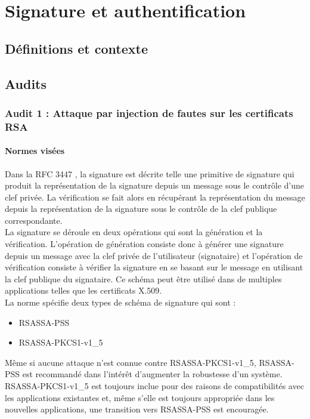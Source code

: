 \chapter{Signature et authentification}
\section{Définitions et contexte}

\section{Audits}
	\subsection{Audit 1 : Attaque par injection de fautes sur les certificats RSA}
		\subsubsection{Normes visées}
Dans la RFC 3447 \cite{rfc3447}, la signature est décrite telle une primitive de signature qui produit la représentation de la signature depuis un message sous le contrôle d'une clef privée. La vérification se fait alors en récupérant la représentation du message depuis la représentation de la signature sous le contrôle de la clef publique correspondante.\\

La signature se déroule en  deux opérations qui sont la génération et la vérification. L'opération de génération consiste donc à générer une signature depuis un message avec la clef privée de l'utilisateur (signataire) et l'opération de vérification consiste à vérifier la signature en se basant sur le message en utilisant la clef publique du signataire. 
Ce schéma peut être utilisé dans de multiples applications telles que les certificats X.509.\\


La norme spécifie deux types de schéma de signature qui sont :
\begin{itemize}
\item RSASSA-PSS
\item RSASSA-PKCS1-v1\_5 \\
\end{itemize}

Même si aucune attaque n'est connue contre RSASSA-PKCS1-v1\_5,  RSASSA-PSS est recommandé dans l'intérêt d'augmenter la robustesse d'un système. RSASSA-PKCS1-v1\_5 est toujours inclue pour des raisons de compatibilités avec les applications existantes et, même s'elle est toujours appropriée dans les nouvelles applications, une transition vers RSASSA-PSS est encouragée.\\ 


